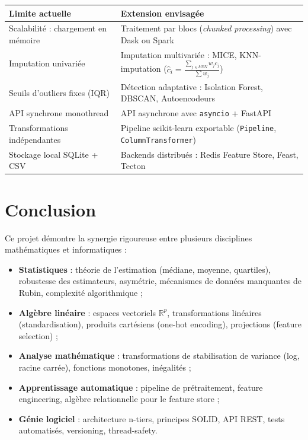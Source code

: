 \documentclass[12pt,a4paper]{article}
\begin{document}
\begin{center}
\renewcommand{\arraystretch}{1.4}
\begin{tabular}{p{5.5cm}p{7cm}}
  \toprule
  \textbf{Limite actuelle} & \textbf{Extension envisagée} \\
  \midrule
  Scalabilité : chargement en mémoire & Traitement par blocs (\textit{chunked processing})
    avec Dask ou Spark \\
  Imputation univariée & Imputation multivariée : MICE, KNN-imputation
    ($\hat{c}_i = \frac{\sum_{j \in kNN} w_j c_j}{\sum w_j}$) \\
  Seuils d'outliers fixes (IQR) & Détection adaptative : Isolation Forest,
    DBSCAN, Autoencodeurs \\
  API synchrone monothread & API asynchrone avec \texttt{asyncio} + FastAPI \\
  Transformations indépendantes & Pipeline scikit-learn exportable
    (\texttt{Pipeline}, \texttt{ColumnTransformer}) \\
  Stockage local SQLite + CSV & Backends distribués : Redis Feature Store,
    Feast, Tecton \\
  \bottomrule
\end{tabular}
\end{center}

\section{Conclusion}

Ce projet démontre la synergie rigoureuse entre plusieurs disciplines
mathématiques et informatiques :

\begin{itemize}[leftmargin=1.5em]
  \item \textbf{Statistiques} : théorie de l'estimation (médiane, moyenne,
    quartiles), robustesse des estimateurs, asymétrie, mécanismes de données
    manquantes de Rubin, complexité algorithmique ;
  \item \textbf{Algèbre linéaire} : espaces vectoriels $\mathbb{R}^p$, transformations
    linéaires (standardisation), produits cartésiens (one-hot encoding),
    projections (feature selection) ;
  \item \textbf{Analyse mathématique} : transformations de stabilisation de variance
    (log, racine carrée), fonctions monotones, inégalités ;
  \item \textbf{Apprentissage automatique} : pipeline de prétraitement,
    feature engineering, algèbre relationnelle pour le feature store ;
  \item \textbf{Génie logiciel} : architecture n-tiers, principes SOLID,
    API REST, tests automatisés, versioning, thread-safety.
\end{itemize}
\end{document}
